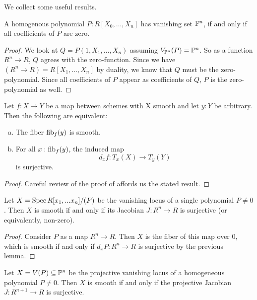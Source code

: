 We collect some useful results.

\begin{lemma}
  \label{homogenous-polynomial-zero}
  A homogenous polynomial $P:R[X_0,\dots,X_n]$ has vanishing set $\mathbb{P}^n$,
  if and only if all coefficients of $P$ are zero.
\end{lemma}

\begin{proof}
  We look at $Q=P(1,X_1,\dots,X_n)$ assuming $V_{\mathbb{P}^n}(P)=\mathbb{P}^n$.
  So as a function $R^n\to R$, $Q$ agrees with the zero-function.
  Since we have $(R^n\to R)=R[X_1,\dots,X_n]$ by duality, we know that $Q$ must be the zero-polynomial.
  Since all coefficients of $P$ appear as coefficients of $Q$, $P$ is the zero-polynomial as well.
\end{proof}

\begin{lemma}
   Let $f : X \to Y$ be a map between schemes with X smooth and let $y:Y$ be arbitrary.
   Then the following are equivalent:
   \begin{enumerate}[(a)]
     \item The fiber $\mathrm{fib}_f(y)$ is smooth.
     \item For all $x : \mathrm{fib}_f(y)$, the induced map \[ d_xf : T_x(X) \to T_y(Y ) \] is surjective.
  \end{enumerate}
\end{lemma}

\begin{proof}
  Careful review of the proof of \cite[Corollary 4.1.1]{diffgeo-article} affords us the stated result.
\end{proof}


\begin{corollary}
  Let $X = \operatorname{Spec} R[x_1,...x_n]/(P)$ be the vanishing locus of a single polynomial $P \neq 0$.
  Then $X$ is smooth if and only if its Jacobian $J: R^n \to R$ is surjective (or equivalently, non-zero).
\end{corollary}

\begin{proof}
  Consider $P$ as a map $R^n \to R$.
  Then $X$ is the fiber of this map over $0$, which is smooth if and only if $d_xP : R^n \to R$ is surjective by the previous lemma.
\end{proof}

\begin{corollary}
  \label{projective-jacobi-criterion}
  Let $X = V(P) \subseteq \mathbb{P}^n$ be the projective vanishing locus of a homogeneous polynomial $P \neq 0$.
  Then $X$ is smooth if and only if the projective Jacobian $J: R^{n+1} \to R$ is surjective.
\end{corollary}

